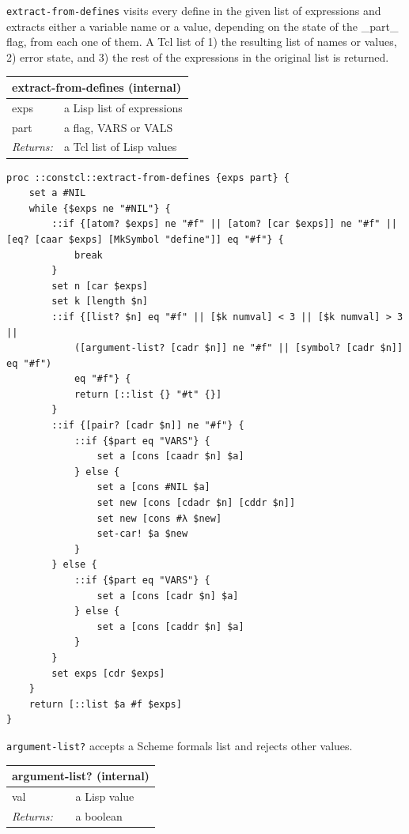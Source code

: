 \documentclass[twoside,9pt]{report}
\begin{document}
\texttt{extract-from-defines} visits every define in the given list of expressions and extracts either a variable name or a value, depending on the state of the \_part\_ flag, from each one of them. A Tcl list of 1) the resulting list of names or values, 2) error state, and 3) the rest of the expressions in the original list is returned.

\begin{tabular}{ |l l| }
\hline
\multicolumn{2}{|l|}{extract-from-defines (internal)} \\
\hline
exps & a Lisp list of expressions \\
part & a flag, VARS or VALS \\
\textit{Returns:} & a Tcl list of Lisp values \\
\hline
\end{tabular}

\noindent\makebox[\linewidth]{\rule{\linewidth}{0.4pt}}
\begin{lstlisting}
proc ::constcl::extract-from-defines {exps part} {
    set a #NIL
    while {$exps ne "#NIL"} {
        ::if {[atom? $exps] ne "#f" || [atom? [car $exps]] ne "#f" || [eq? [caar $exps] [MkSymbol "define"]] eq "#f"} {
            break
        }
        set n [car $exps]
        set k [length $n]
        ::if {[list? $n] eq "#f" || [$k numval] < 3 || [$k numval] > 3 ||
            ([argument-list? [cadr $n]] ne "#f" || [symbol? [cadr $n]] eq "#f")
            eq "#f"} {
            return [::list {} "#t" {}]
        }
        ::if {[pair? [cadr $n]] ne "#f"} {
            ::if {$part eq "VARS"} {
                set a [cons [caadr $n] $a]
            } else {
                set a [cons #NIL $a]
                set new [cons [cdadr $n] [cddr $n]]
                set new [cons #λ $new]
                set-car! $a $new
            }
        } else {
            ::if {$part eq "VARS"} {
                set a [cons [cadr $n] $a]
            } else {
                set a [cons [caddr $n] $a]
            }
        }
        set exps [cdr $exps]
    }
    return [::list $a #f $exps]
}
\end{lstlisting}
\noindent\makebox[\linewidth]{\rule{\linewidth}{0.4pt}}

\texttt{argument-list?} accepts a Scheme formals list and rejects other values.

\begin{tabular}{ |l l| }
\hline
\multicolumn{2}{|l|}{argument-list? (internal)} \\
\hline
val & a Lisp value \\
\textit{Returns:} & a boolean \\
\hline
\end{tabular}
\end{document}
